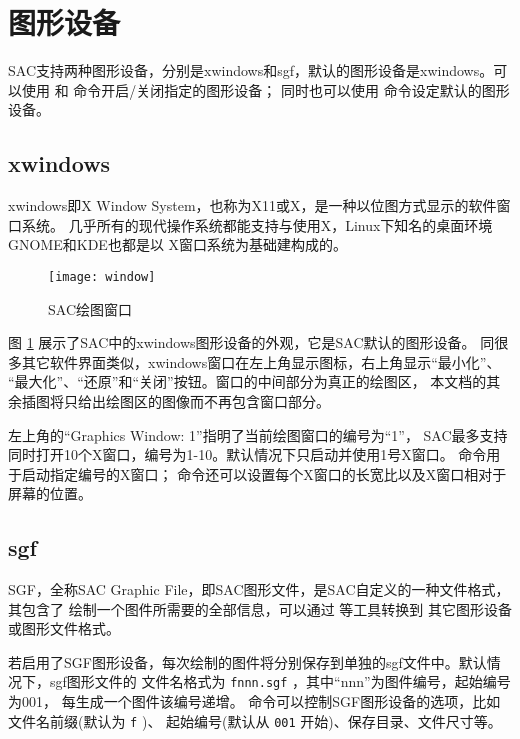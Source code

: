 \section{图形设备}
SAC支持两种图形设备，分别是xwindows和sgf，默认的图形设备是xwindows。可以使用
 和  命令开启/关闭指定的图形设备；
同时也可以使用  命令设定默认的图形设备。

\subsection{xwindows}
xwindows即X Window System，也称为X11或X，是一种以位图方式显示的软件窗口系统。
几乎所有的现代操作系统都能支持与使用X，Linux下知名的桌面环境GNOME和KDE也都是以
X窗口系统为基础建构成的。

\begin{figure}[H]
\centering
\texttt{[image: window]}
\caption{SAC绘图窗口}
\label{fig:plot}
\end{figure}

图 \ref{fig:plot} 展示了SAC中的xwindows图形设备的外观，它是SAC默认的图形设备。
同很多其它软件界面类似，xwindows窗口在左上角显示图标，右上角显示``最小化''、
``最大化''、``还原''和``关闭''按钮。窗口的中间部分为真正的绘图区，
本文档的其余插图将只给出绘图区的图像而不再包含窗口部分。

左上角的``Graphics Window: 1''指明了当前绘图窗口的编号为``1''，
SAC最多支持同时打开10个X窗口，编号为1-10。默认情况下只启动并使用1号X窗口。
 命令用于启动指定编号的X窗口；
 命令还可以设置每个X窗口的长宽比以及X窗口相对于屏幕的位置。

\subsection{sgf}
SGF，全称SAC Graphic File，即SAC图形文件，是SAC自定义的一种文件格式，其包含了
绘制一个图件所需要的全部信息，可以通过  等工具转换到
其它图形设备或图形文件格式。

若启用了SGF图形设备，每次绘制的图件将分别保存到单独的sgf文件中。默认情况下，sgf图形文件的
文件名格式为 \texttt{fnnn.sgf} ，其中``nnn''为图件编号，起始编号为001，
每生成一个图件该编号递增。
 命令可以控制SGF图形设备的选项，比如文件名前缀(默认为 \texttt{f} )、
起始编号(默认从 \texttt{001} 开始)、保存目录、文件尺寸等。
